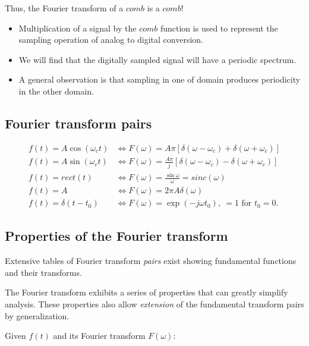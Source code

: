 \documentclass[11pt,letterpaper,draft]{exam}
\begin{document}
Thus, the Fourier transform of a $comb$ is a $comb$!
\begin{itemize}
\item Multiplication of a signal by the $comb$ function is used to represent
the sampling operation of analog to digital conversion.
\item We will find that the digitally sampled signal will have a periodic spectrum.
\item A general observation is that sampling in one of domain produces
periodicity in the other domain.
\end{itemize}

\subsection*{Fourier transform pairs}

\begin{equation*}
\begin{split}
f(t) = A\cos(\omega_c t) &\Longleftrightarrow F(\omega) = A\pi[\delta(\omega-\omega_c)+\delta(\omega+\omega_c)]\\
f(t) = A\sin(\omega_c t)&\Longleftrightarrow F(\omega) = \frac{A\pi}{j}[\delta(\omega-\omega_c)-\delta(\omega+\omega_c)]\\
f(t) = rect(t) &\Longleftrightarrow F(\omega) =
\frac{\sin\omega}{\omega} = sinc(\omega)\\
f(t) = A &\Longleftrightarrow F(\omega) = 2\pi A\delta(\omega)\\
f(t) = \delta(t-t_0) &\Longleftrightarrow F(\omega) = \exp(-j\omega
t_0),~ = 1 \text{ for } t_0 = 0.
\end{split}
\end{equation*}

\subsection*{Properties of the Fourier transform}

Extensive tables of Fourier transform \textit{pairs} exist showing
fundamental functions and their transforms.

The Fourier transform exhibits a series of properties that can greatly
simplify analysis.  These properties also allow \textit{extension} of the
fundamental transform pairs by generalization.

Given $f(t)$ and its Fourier transform $F(\omega)$:
\end{document}
